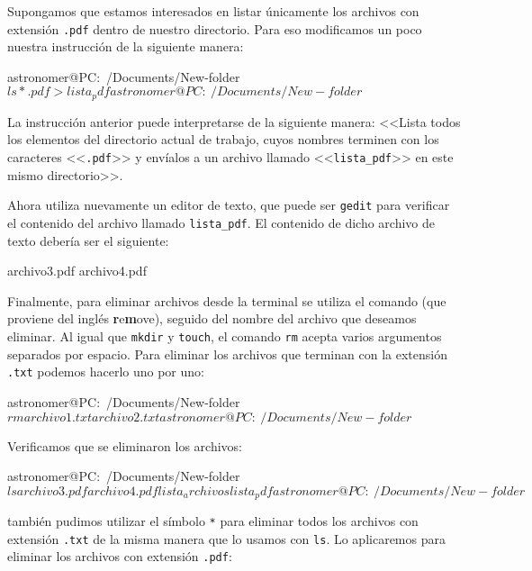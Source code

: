 Supongamos que estamos interesados en listar únicamente los archivos con extensión \texttt{.pdf} dentro de nuestro directorio. Para eso modificamos un poco nuestra instrucción de la siguiente manera:

\begin{bash}
astronomer@PC:~/Documents/New-folder $ ls *.pdf > lista_pdf
astronomer@PC:~/Documents/New-folder $
\end{bash}

La instrucción anterior puede interpretarse de la siguiente manera: <<Lista todos los elementos del directorio actual de trabajo, cuyos nombres terminen con los caracteres <<\texttt{.pdf}>> y envíalos a un archivo llamado <<\texttt{lista_pdf}>> en este mismo directorio>>. 

Ahora utiliza nuevamente un editor de texto, que puede ser \texttt{gedit} para verificar el contenido del archivo llamado \texttt{lista_pdf}. El contenido de dicho archivo de texto debería ser el siguiente:

\begin{bash}
archivo3.pdf
archivo4.pdf
\end{bash}

Finalmente, para eliminar archivos desde la terminal se utiliza el comando  (que proviene del inglés \textbf{r}e\textbf{m}ove), seguido del nombre del archivo que deseamos eliminar. Al igual que \texttt{mkdir} y \texttt{touch}, el comando \texttt{rm} acepta varios argumentos separados por espacio. Para eliminar los archivos que terminan con la extensión \texttt{.txt} podemos hacerlo uno por uno:

\begin{bash}
astronomer@PC:~/Documents/New-folder $ rm archivo1.txt archivo2.txt
astronomer@PC:~/Documents/New-folder $
\end{bash}

Verificamos que se eliminaron los archivos:

\begin{bash}
astronomer@PC:~/Documents/New-folder $ ls
archivo3.pdf  archivo4.pdf  lista_archivos  lista_pdf
astronomer@PC:~/Documents/New-folder $
\end{bash}

también pudimos utilizar el símbolo \texttt{*} para eliminar todos los archivos con extensión \texttt{.txt} de la misma manera que lo usamos con \texttt{ls}. Lo aplicaremos para eliminar los archivos con extensión \texttt{.pdf}:

